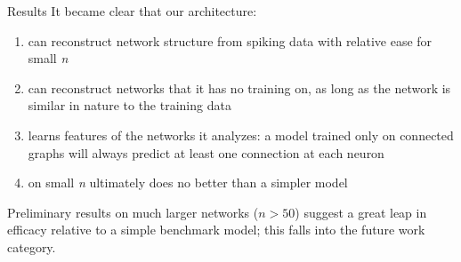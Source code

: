 \documentclass[12pt]{article}
\begin{document}
\begin{posterbard}




	\begin{posterboxtitle}{Results}
		\noindent It became clear that our architecture:
		\begin{enumerate}
			\item can reconstruct network structure from spiking data with 
				relative ease for small \textit{n}
			\item can reconstruct networks that it has no training on, as long 
				as the network is similar in nature to the training data
			\item learns features of the networks it analyzes: a model trained 
				only on connected graphs will always predict at least one 
				connection at each neuron
			\item on small \textit{n} ultimately does no better than a simpler 
				model
		\end{enumerate}
		Preliminary results on much larger networks ($n > 50$) suggest a great 
		leap in efficacy relative to a simple benchmark model; this falls into 
		the future work category.
	\end{posterboxtitle}


\end{posterbard}
\end{document}
